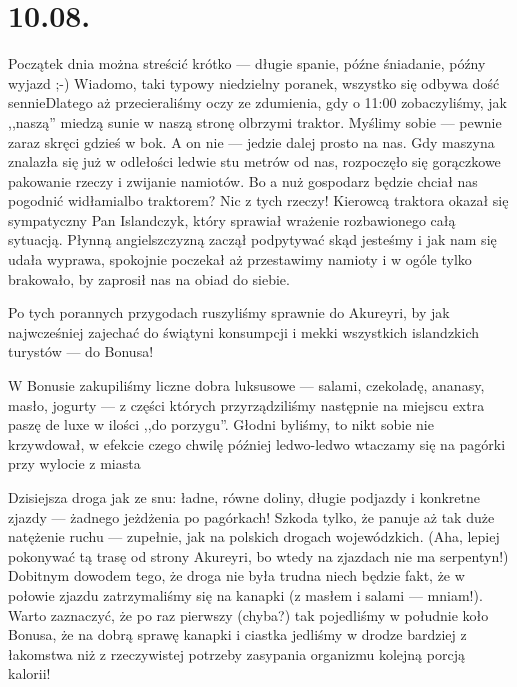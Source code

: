 \chapter*{10.08.}

Początek dnia można streścić krótko --- długie spanie, późne śniadanie, późny wyjazd ;-) Wiadomo, taki typowy niedzielny poranek, wszystko się odbywa dość sennie\textellipsis Dlatego aż przecieraliśmy oczy ze zdumienia, gdy o 11:00 zobaczyliśmy, jak ,,naszą'' miedzą sunie w naszą stronę olbrzymi traktor. Myślimy sobie --- pewnie zaraz skręci gdzieś w bok. A on nie --- jedzie dalej prosto na nas. Gdy maszyna znalazła się już w odlełości ledwie stu metrów od nas, rozpoczęło się gorączkowe pakowanie rzeczy i zwijanie namiotów. Bo a nuż gospodarz będzie chciał nas pogodnić widłami\textellipsis albo traktorem? Nic z tych rzeczy! Kierowcą traktora okazał się sympatyczny Pan Islandczyk, który sprawiał wrażenie rozbawionego całą sytuacją. Płynną angielszczyzną zaczął podpytywać skąd jesteśmy i jak nam się udała wyprawa, spokojnie poczekał aż przestawimy namioty i w ogóle tylko brakowało, by zaprosił nas na obiad do siebie.

Po tych porannych przygodach ruszyliśmy sprawnie do Akureyri, by jak najwcześniej zajechać do świątyni konsumpcji i mekki wszystkich islandzkich turystów --- do Bonusa!


W Bonusie zakupiliśmy liczne dobra luksusowe --- salami, czekoladę, ananasy, masło, jogurty --- z części których przyrządziliśmy następnie na miejscu extra paszę de luxe w ilości ,,do porzygu''. Głodni byliśmy, to nikt sobie nie krzywdował, w efekcie czego chwilę później ledwo-ledwo wtaczamy się na pagórki przy wylocie z miasta\textellipsis


Dzisiejsza droga jak ze snu: ładne, równe doliny, długie podjazdy i konkretne zjazdy --- żadnego jeżdżenia po pagórkach! Szkoda tylko, że panuje aż tak duże natężenie ruchu --- zupełnie, jak na polskich drogach wojewódzkich. (Aha, lepiej pokonywać tą trasę od strony Akureyri, bo wtedy na zjazdach nie ma serpentyn!) Dobitnym dowodem tego, że droga nie była trudna niech będzie fakt, że w połowie zjazdu zatrzymaliśmy się na kanapki (z masłem i salami --- mniam!). Warto zaznaczyć, że po raz pierwszy (chyba?) tak pojedliśmy w południe koło Bonusa, że na dobrą sprawę kanapki i ciastka jedliśmy w drodze bardziej z łakomstwa niż z rzeczywistej potrzeby zasypania organizmu kolejną porcją kalorii!

